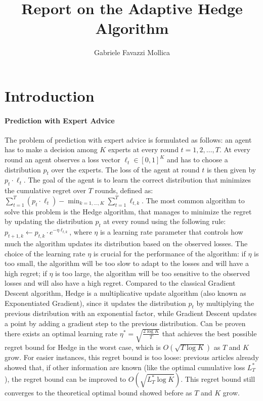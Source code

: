 \documentclass{article}
\begin{document}
\title{Report on the Adaptive Hedge Algorithm}
\author{Gabriele Favazzi Mollica}
\maketitle

\section{Introduction}
\paragraph{Prediction with Expert Advice}
The problem of prediction with expert advice is formulated as follows: 
an agent has to make a decision among $K$ experts at every round $t=1,2,\ldots,T$.
At every round an agent observes a loss vector $\ell_t \in [0,1]^K$ and has to choose a distribution $p_t$ over the experts.
The loss of the agent at round $t$ is then given by $p_t \cdot \ell_t$. The goal of the agent is to learn the correct distribution
that minimizes the cumulative regret over $T$ rounds, defined as: $ \sum_{t=1}^T (p_t \cdot \ell_t) - \min_{k=1,\ldots,K} \sum_{t=1}^T \ell_{t,k} $.
The most common algorithm to solve this problem is the Hedge algorithm, that manages to minimize the regret 
by updating the distribution $p_t$ at every round using the following rule: $p_{t+1,k} \leftarrow p_{t,k} \cdot e^{-\eta \ell_{t,k}}$, 
where $\eta$ is a learning rate parameter that controls how much the algorithm updates its distribution based on the observed losses.
The choice of the learning rate $\eta$ is crucial for the performance of the algorithm:
if $\eta$ is too small, the algorithm will be too slow to adapt to the losses and will have a high regret; if $\eta$ is too large, the algorithm will be too sensitive to the observed losses and will also have a high regret.
Compared to the classical Gradient Descent algorithm, Hedge is a multiplicative update algorithm (also known as Exponentiated Gradient), 
since it updates the distribution $p_t$ by multiplying the previous distribution with an exponential factor, while
Gradient Descent updates a point by adding a gradient step to the previous distribution.
Can be proven there exists an optimal learning rate $\eta^* = \sqrt{\frac{2\log K}{T}}$ that achieves the best possible regret bound for Hedge in the worst case, 
which is $O(\sqrt{T \log K})$ as $T$ and $K$ grow. 
For easier instances, this regret bound is too loose: previous articles already showed that, if other information are known (like the optimal cumulative loss $L_T^*$),
the regret bound can be improved to $O(\sqrt{L_T^* \log K})$. This regret bound still converges to the theoretical optimal bound showed before as $T$ and $K$ grow.
\end{document}
